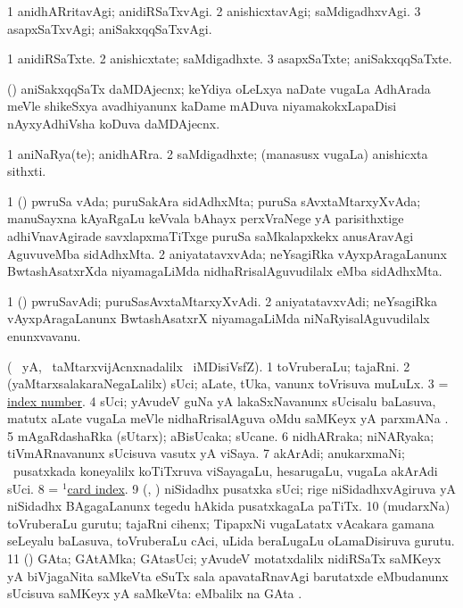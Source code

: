 \bentry
{}
\gl{\kirxvi}
\bmng
\bnum
\num{1} anidhARritavAgi; anidiRSaTxvAgi. 
\num{2} anishicxtavAgi; saMdigadhxvAgi. 
\num{3} asapxSaTxvAgi; aniSakxqqSaTxvAgi. 
\enum
\emng
\eentry

\bentry
{}
\gl{\nA}
\bmng
\bnum
\num{1} anidiRSaTxte. 
\num{2} anishicxtate; saMdigadhxte. 
\num{3} asapxSaTxte; aniSakxqqSaTxte. 
\enum
\emng
\eentry

\bentry
{}
\gl{\nA}
\bmng
(\nAyxshA) aniSakxqqSaTx daMDAjecnx; keYdiya oLeLxya naDate \mo vugaLa AdhArada meVle shikeSxya avadhiyanunx kaDame mADuva niyamakokxLapaDisi nAyxyAdhiVsha koDuva daMDAjecnx. 
\emng
\eentry

\bentry
{}
\gl{\nA}
\bmng
\bnum
\num{1} aniNaRya(te); anidhARra. 
\num{2} saMdigadhxte; (manasusx \mo vugaLa) anishicxta sithxti. 
\enum
\emng
\eentry

\bentry
{}
\gl{\nA}
\bmng
\bnum
\num{1} (\tashA) pwruSa vAda; puruSakAra sidAdhxMta; puruSa sAvxtaMtarxyXvAda; manuSayxna kAyaRgaLu keVvala bAhayx perxVraNege yA parisithxtige adhiVnavAgirade savxlapxmaTiTxge puruSa saMkalapxkekx anusAravAgi AguvuveMba sidAdhxMta. 
\num{2} aniyatatavxvAda; neYsagiRka vAyxpAragaLanunx BwtashAsatxrXda niyamagaLiMda nidhaRrisalAguvudilalx eMba sidAdhxMta. 
\enum
\emng
\eentry

\bentry
{}
\gl{\nA}
\bmng
\bnum
\num{1} (\tashA) pwruSavAdi; puruSasAvxtaMtarxyXvAdi. 
\num{2} aniyatatavxvAdi; neYsagiRka vAyxpAragaLanunx BwtashAsatxrX niyamagaLiMda niNaRyisalAguvudilalx enunxvavanu. 
\enum
\emng
\eentry

\bentry
{}
\gl{\nA}
\bmng
(\bava\  yA, \kanmu\ taMtarxvijAcnxnadalilx  \ucAcx\ iMDisiVsfZ). 
\bnum
\num{1} toVruberaLu; tajaRni. 
\num{2} (yaMtarxsalakaraNegaLalilx) sUci; aLate, tUka, \mo vanunx toVrisuva muLuLx. 
\num{3}  = \hyperlink{index number}{index number}. 
\num{4} sUci; yAvudeV guNa yA lakaSxNavanunx sUcisalu baLasuva, matutx aLate \mo vugaLa meVle nidhaRrisalAguva oMdu saMKeyx yA parxmANa . 
\num{5} mAgaRdashaRka (sUtarx); aBisUcaka; sUcane. 
\num{6} nidhARraka; niNARyaka; tiVmARnavanunx sUcisuva vasutx yA viSaya. 
\num{7} akArAdi; anukarxmaNi; \sA\ pusatxkada koneyalilx koTiTxruva viSayagaLu, hesarugaLu, \mo vugaLa akArAdi sUci. 
\num{8} = \hyperref{kandict_c.pdf}{C}{card index(1)}{$^1$card index}. 
\num{9} (\ca, ) niSidadhx pusatxka sUci; \roVkAyx rige niSidadhxvAgiruva yA niSidadhx BAgagaLanunx tegedu hAkida pusatxkagaLa paTiTx. 
\num{10} (mudarxNa) toVruberaLu gurutu; tajaRni cihenx; TipapxNi \mo vugaLatatx vAcakara gamana seLeyalu baLasuva, toVruberaLu cAci, uLida beraLugaLu oLamaDisiruva gurutu. 
\num{11} (\ga) GAta; GAtAMka; GAtasUci; yAvudeV motatxdalilx nidiRSaTx saMKeyx yA biVjagaNita saMkeVta eSuTx sala apavataRnavAgi barutatxde eMbudanunx sUcisuva saMKeyx yA saMkeVta:     eMbalilx na GAta . 
\enum
\emng
\eentry

